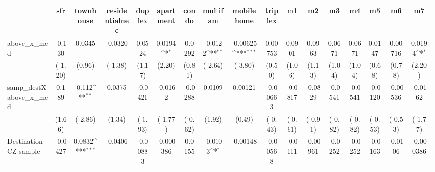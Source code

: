 \begin{table}[htbp]\centering
\def\sym#1{\ifmmode^{#1}\else\(^{#1}\)\fi}
\caption{ \label{tab1}}
\begin{tabular}{l*{16}{c}}
\toprule
                    &\multicolumn{1}{c}{sfr}&\multicolumn{1}{c}{townhouse}&\multicolumn{1}{c}{residentialnec}&\multicolumn{1}{c}{duplex}&\multicolumn{1}{c}{apartment}&\multicolumn{1}{c}{condo}&\multicolumn{1}{c}{multifam}&\multicolumn{1}{c}{mobilehome}&\multicolumn{1}{c}{triplex}&\multicolumn{1}{c}{m1}&\multicolumn{1}{c}{m2}&\multicolumn{1}{c}{m3}&\multicolumn{1}{c}{m4}&\multicolumn{1}{c}{m5}&\multicolumn{1}{c}{m6}&\multicolumn{1}{c}{m7}\\
\midrule
above\_x\_med         &      -0.130         &      0.0345         &     -0.0320         &      0.0524         &      0.0194\sym{*}  &      0.0292         &     -0.0122\sym{**} &    -0.00625\sym{***}&     0.00753         &      0.0901         &      0.0963         &      0.0671         &      0.0671         &      0.0147         &     0.00716         &      0.0194\sym{*}  \\
                    &     (-1.20)         &      (0.96)         &     (-1.38)         &      (1.17)         &      (2.20)         &      (0.81)         &     (-2.64)         &     (-3.80)         &      (0.50)         &      (1.06)         &      (1.13)         &      (1.04)         &      (1.04)         &      (0.68)         &      (0.78)         &      (2.20)         \\
\addlinespace
samp\_destXabove\_x\_med&       0.189         &      -0.112\sym{**} &      0.0375         &     -0.0421         &     -0.0162         &     -0.0288         &      0.0109         &     0.00121         &    -0.00663         &     -0.0817         &     -0.0829         &     -0.0541         &     -0.0541         &     -0.0120         &    -0.00536         &     -0.0162         \\
                    &      (1.66)         &     (-2.86)         &      (1.34)         &     (-0.93)         &     (-1.77)         &     (-0.62)         &      (1.92)         &      (0.49)         &     (-0.43)         &     (-0.91)         &     (-0.91)         &     (-0.82)         &     (-0.82)         &     (-0.53)         &     (-0.53)         &     (-1.77)         \\
\addlinespace
Destination CZ sample&     -0.0427         &      0.0832\sym{***}&     -0.0406         &    -0.00883         &   -0.000386         &      0.0155         &     -0.0103\sym{*}  &    -0.00148         &    -0.00568         &     -0.0111         &    -0.00961         &     -0.0252         &     -0.0252         &     -0.0163         &     -0.0106         &   -0.000386         \\

\end{tabular}
\end{table}
